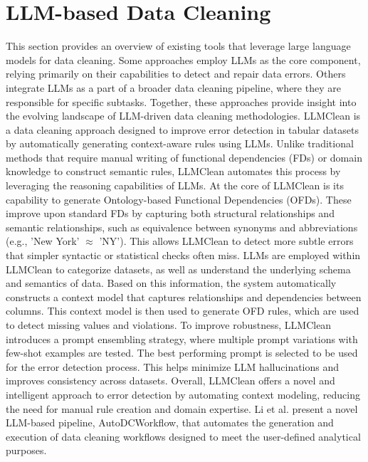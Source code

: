 \section{LLM-based Data Cleaning}
This section provides an overview of existing tools that leverage large language models for data cleaning. 
Some approaches employ LLMs as the core component, relying primarily on their capabilities to detect and repair data errors. 
Others integrate LLMs as a part of a broader data cleaning pipeline, where they are responsible for specific subtasks.
Together, these approaches provide insight into the evolving landscape of LLM-driven data cleaning methodologies.
\newline\newline
LLMClean \cite{LLMCLEAN} is a data cleaning approach designed to improve error detection in tabular datasets by automatically generating context-aware rules using LLMs. 
Unlike traditional methods that require manual writing of functional dependencies (FDs) or domain knowledge to construct semantic rules, LLMClean automates this process by leveraging the reasoning capabilities of LLMs. 
At the core of LLMClean is its capability to generate Ontology-based Functional Dependencies (OFDs). 
These improve upon standard FDs by capturing both structural relationships and semantic relationships, such as equivalence between synonyms and abbreviations (e.g., 'New York'  $\approx$ 'NY'). 
This allows LLMClean to detect more subtle errors that simpler syntactic or statistical checks often miss. 
LLMs are employed within LLMClean to categorize datasets, as well as understand the underlying schema and semantics of data. 
Based on this information, the system automatically constructs a context model that captures relationships and dependencies between columns. 
This context model is then used to generate OFD rules, which are used to detect missing values and violations. 
To improve robustness, LLMClean introduces a prompt ensembling strategy, where multiple prompt variations with few-shot examples are tested. 
The best performing prompt is selected to be used for the error detection process. 
This helps minimize LLM hallucinations and improves consistency across datasets. 
Overall, LLMClean offers a novel and intelligent approach to error detection by automating context modeling, reducing the need for manual rule creation and domain expertise.
\newline\newline
Li et al. \cite{AUTODCWORKFLOW} present a novel LLM-based pipeline, AutoDCWorkflow, that automates the generation and execution of data cleaning workflows designed to meet the user-defined analytical purposes. 
